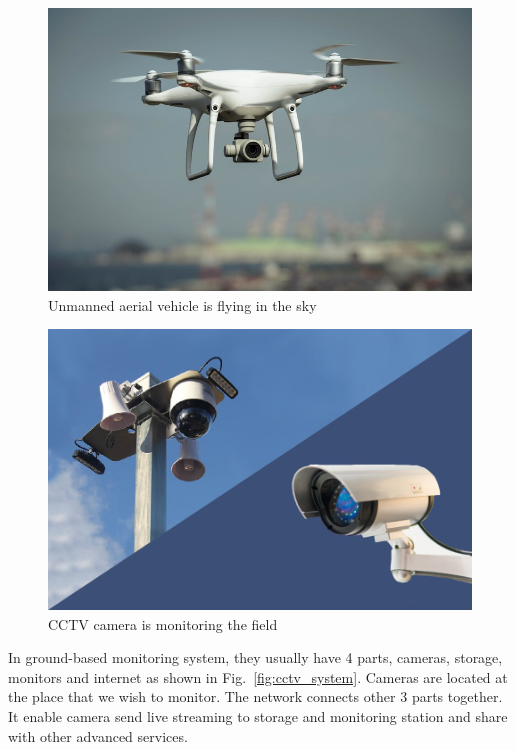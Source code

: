 \begin{figure}[H]
    \centering
    \includegraphics[width=\textwidth]{figsrc/uav.jpeg}
    \caption{Unmanned aerial vehicle is flying in the sky\label{fig:uav}}
\end{figure}


\begin{figure}[H]
    \centering
    \includegraphics[width=\textwidth]{figsrc/cctv_camera.jpeg}
    \caption{CCTV camera is monitoring the field\label{fig:cctv_camera}}
\end{figure}

In ground-based monitoring system, they usually have 4 parts, cameras, storage, monitors and internet as shown in Fig.~\ref{fig:cctv_system}. Cameras are located at the place that we wish to monitor. The network connects other 3 parts together. It enable camera send live streaming to storage and monitoring station and share with other advanced services.


